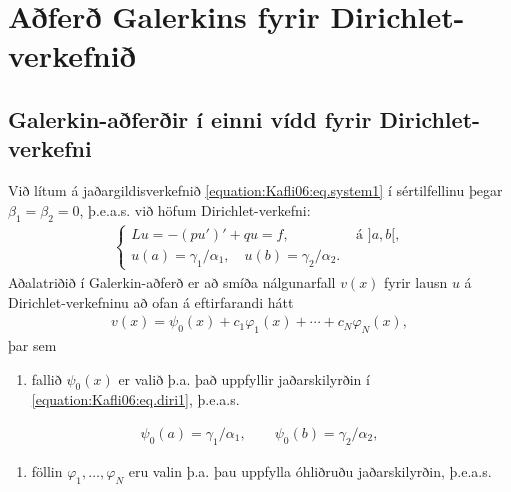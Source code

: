 \documentclass[a4paper,10pt,icelandic]{sphinxmanual}
\begin{document}
\section{Aðferð Galerkins fyrir Dirichlet-verkefnið}
\label{\detokenize{Kafli06:afer-galerkins-fyrir-dirichlet-verkefni}}

\subsection{Galerkin-aðferðir í einni vídd fyrir Dirichlet-verkefni}
\label{\detokenize{Kafli06:galerkin-aferir-i-einni-vidd-fyrir-dirichlet-verkefni}}\label{\detokenize{Kafli06:ch-6-2-1}}
Við lítum á jaðargildisverkefnið \eqref{equation:Kafli06:eq.system1} í sértilfellinu þegar \(\beta_1 =\beta_2=0\), þ.e.a.s. við höfum Dirichlet-verkefni:
\begin{equation}\label{equation:Kafli06:eq.diri1}
\begin{split}\begin{cases}
Lu=-(pu')'+qu=f,& \text{ á } ]a,b[,\\
u(a)=\gamma_1/\alpha_1, \quad  u(b)=\gamma_2/\alpha_2.
\end{cases}\end{split}
\end{equation}
Aðalatriðið í Galerkin-aðferð er að smíða nálgunarfall \(v(x)\) fyrir lausn \(u\) á Dirichlet-verkefninu að ofan á eftirfarandi hátt
\begin{equation*}
\begin{split}v(x)=\psi_0(x)+c_1\varphi_1(x)+\cdots+c_N\varphi_N(x),\end{split}
\end{equation*}
þar sem
\begin{enumerate}
\def\theenumi{\arabic{enumi}}
\def\labelenumi{\theenumi .}
\makeatletter\def\p@enumii{\p@enumi \theenumi .}\makeatother
\item {} 
fallið \(\psi_0(x)\) er valið þ.a. það uppfyllir jaðarskilyrðin í \eqref{equation:Kafli06:eq.diri1}, þ.e.a.s.

\end{enumerate}
\begin{equation*}
\begin{split}\psi_0(a)=\gamma_1/\alpha_1, \qquad  \psi_0(b)=\gamma_2/\alpha_2,\end{split}
\end{equation*}\begin{enumerate}
\def\theenumi{\arabic{enumi}}
\def\labelenumi{\theenumi .}
\makeatletter\def\p@enumii{\p@enumi \theenumi .}\makeatother
\setcounter{enumi}{1}
\item {} 
föllin \(\varphi_1,\dots,\varphi_N\) eru valin þ.a. þau uppfylla óhliðruðu jaðarskilyrðin, þ.e.a.s.

\end{enumerate}
\end{document}
